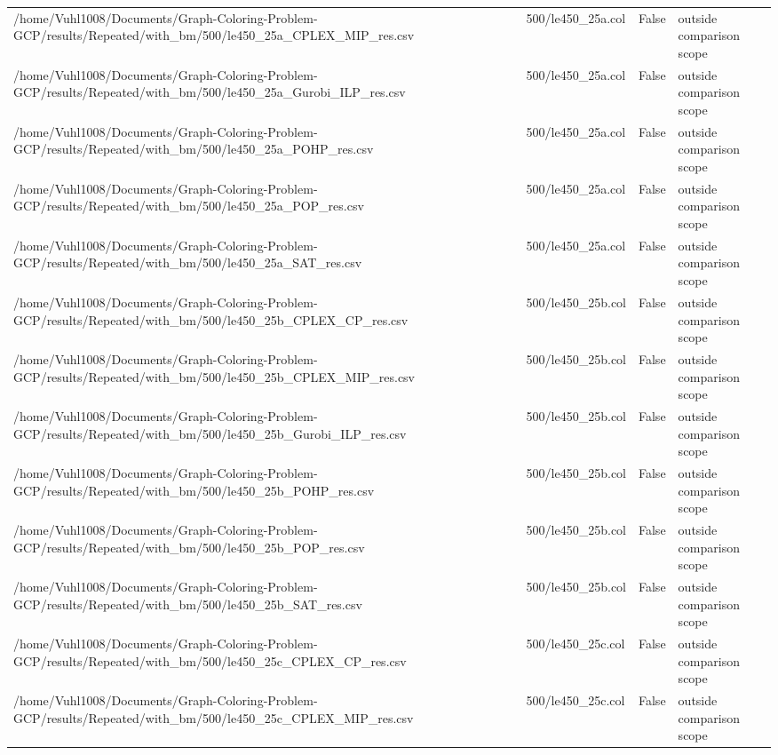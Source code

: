 \begin{table}[htbp]
\begin{tabular}{llll}
/home/Vuhl1008/Documents/Graph-Coloring-Problem-GCP/results/Repeated/with\_bm/500/le450\_25a\_CPLEX\_MIP\_res.csv & 500/le450\_25a.col & False & outside comparison scope \\
/home/Vuhl1008/Documents/Graph-Coloring-Problem-GCP/results/Repeated/with\_bm/500/le450\_25a\_Gurobi\_ILP\_res.csv & 500/le450\_25a.col & False & outside comparison scope \\
/home/Vuhl1008/Documents/Graph-Coloring-Problem-GCP/results/Repeated/with\_bm/500/le450\_25a\_POHP\_res.csv & 500/le450\_25a.col & False & outside comparison scope \\
/home/Vuhl1008/Documents/Graph-Coloring-Problem-GCP/results/Repeated/with\_bm/500/le450\_25a\_POP\_res.csv & 500/le450\_25a.col & False & outside comparison scope \\
/home/Vuhl1008/Documents/Graph-Coloring-Problem-GCP/results/Repeated/with\_bm/500/le450\_25a\_SAT\_res.csv & 500/le450\_25a.col & False & outside comparison scope \\
/home/Vuhl1008/Documents/Graph-Coloring-Problem-GCP/results/Repeated/with\_bm/500/le450\_25b\_CPLEX\_CP\_res.csv & 500/le450\_25b.col & False & outside comparison scope \\
/home/Vuhl1008/Documents/Graph-Coloring-Problem-GCP/results/Repeated/with\_bm/500/le450\_25b\_CPLEX\_MIP\_res.csv & 500/le450\_25b.col & False & outside comparison scope \\
/home/Vuhl1008/Documents/Graph-Coloring-Problem-GCP/results/Repeated/with\_bm/500/le450\_25b\_Gurobi\_ILP\_res.csv & 500/le450\_25b.col & False & outside comparison scope \\
/home/Vuhl1008/Documents/Graph-Coloring-Problem-GCP/results/Repeated/with\_bm/500/le450\_25b\_POHP\_res.csv & 500/le450\_25b.col & False & outside comparison scope \\
/home/Vuhl1008/Documents/Graph-Coloring-Problem-GCP/results/Repeated/with\_bm/500/le450\_25b\_POP\_res.csv & 500/le450\_25b.col & False & outside comparison scope \\
/home/Vuhl1008/Documents/Graph-Coloring-Problem-GCP/results/Repeated/with\_bm/500/le450\_25b\_SAT\_res.csv & 500/le450\_25b.col & False & outside comparison scope \\
/home/Vuhl1008/Documents/Graph-Coloring-Problem-GCP/results/Repeated/with\_bm/500/le450\_25c\_CPLEX\_CP\_res.csv & 500/le450\_25c.col & False & outside comparison scope \\
/home/Vuhl1008/Documents/Graph-Coloring-Problem-GCP/results/Repeated/with\_bm/500/le450\_25c\_CPLEX\_MIP\_res.csv & 500/le450\_25c.col & False & outside comparison scope \\

\end{tabular}
\end{table}
